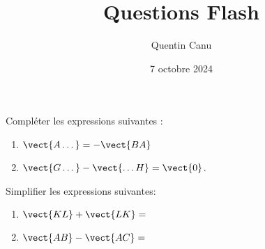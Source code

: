\documentclass{article}
\title{Questions Flash}
\date{7 octobre 2024}
\author{Quentin Canu}
\begin{document}
\maketitle

\begin{enumquestions}
\item Compléter les expressions suivantes :
\begin{enumerate}
\item $\vect{A \dots} = - \vect{BA}$
\item $\vect{G\dots} - \vect{\dots H} = \vect{0}$. 
\end{enumerate}
\item Simplifier les expressions suivantes:
\begin{enumerate}
\item $\vect{KL} + \vect{LK} =$ 
\item $\vect{AB} - \vect{AC} =$
\end{enumerate}
\end{enumquestions}
\end{document}
